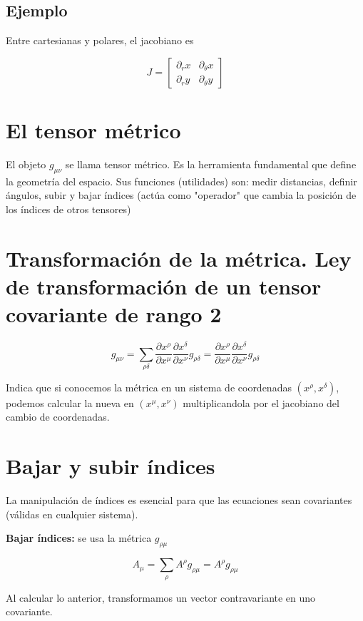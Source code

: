 \documentclass[a4paper]{article}
\begin{document}
\subsection{Ejemplo}

Entre cartesianas y polares, el jacobiano es 

$$J = \begin{bmatrix} \partial_r x & \partial_\theta x \\ \partial_r y & \partial_\theta y \end{bmatrix}$$

\section{El tensor métrico}

El objeto $g_{\mu \nu}$ se llama tensor métrico. Es la herramienta fundamental que define la geometría del espacio. Sus funciones (utilidades) son: medir distancias, definir ángulos, subir y bajar índices (actúa como "operador" que cambia la posición de los índices de otros tensores)

\section{Transformación de la métrica. Ley de transformación de un tensor covariante de rango 2}

$$g_{\mu \nu} = \sum_{\rho \delta} \frac{\partial x^{\rho}}{\partial x^{\mu}} \frac{\partial x^{\delta}}{\partial x^{\nu}}g_{\rho\delta} = \frac{\partial x^{\rho}}{\partial x^{\mu}} \frac{\partial x^{\delta}}{\partial x^{\nu}}g_{\rho\delta}$$

Indica que si conocemos la métrica en un sistema de coordenadas $(x^\rho,x^\delta)$, podemos calcular la nueva en $(x^\mu,x^\nu)$ multiplicandola por el jacobiano del cambio de coordenadas.

\section{Bajar y subir índices}

La manipulación de índices es esencial para que las ecuaciones sean covariantes (válidas en cualquier sistema).

\textbf{Bajar índices:} se usa la métrica $g_{\rho\mu}$

$$A_\mu = \sum_{\rho}A^{\rho} g_{\rho \mu} = A^{\rho} g_{\rho \mu}$$

Al calcular lo anterior, transformamos un vector contravariante en uno covariante.
\end{document}
